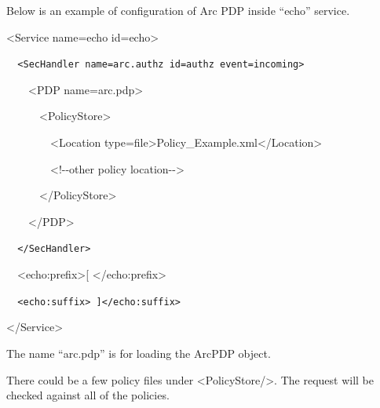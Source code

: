 \documentclass[a4paper]{article}
\begin{document}
{\upshape\color{black}
Below is an example of configuration of Arc PDP inside
{\textquotedblleft}echo{\textquotedblright} service.}

{\ttfamily\color{black}
{\textless}Service name={\textquotedbl}echo{\textquotedbl}
id={\textquotedbl}echo{\textquotedbl}{\textgreater}}

{\upshape\color{black}
\foreignlanguage{spanish}{\texttt{\ \ }}\texttt{{\textless}SecHandler
name={\textquotedbl}arc.authz{\textquotedbl}
id={\textquotedbl}authz{\textquotedbl}
event={\textquotedbl}incoming{\textquotedbl}{\textgreater}}}

{\ttfamily\color{black}
\ \ \ \ {\textless}PDP
name={\textquotedbl}arc.pdp{\textquotedbl}{\textgreater}}

{\ttfamily\color{black}
\ \ \ \ \ \ {\textless}PolicyStore{\textgreater}}

{\ttfamily\color{black}
\ \ \ \ \ \ \ \ {\textless}Location
type={\textquotedbl}file{\textquotedbl}{\textgreater}Policy\_Example.xml{\textless}/Location{\textgreater}}

{\ttfamily\color{black}
\ \ \ \ \ \ \ \ {\textless}!-{}-other policy location-{}-{\textgreater}}

{\ttfamily\color{black}
\ \ \ \ \ \ {\textless}/PolicyStore{\textgreater}}

{\ttfamily\color{black}
\ \ \ \ {\textless}/PDP{\textgreater}}

{\upshape\color{black}
\texttt{\ \ }\foreignlanguage{spanish}{\texttt{{\textless}/SecHandler{\textgreater}}}}

{\ttfamily\color{black}
\ \ {\textless}echo:prefix{\textgreater}[
{\textless}/echo:prefix{\textgreater}}

{\upshape\color{black}
\foreignlanguage{spanish}{\texttt{\ \ }}\texttt{{\textless}echo:suffix{\textgreater}
]{\textless}/echo:suffix{\textgreater}}}

{\ttfamily\color{black}
{\textless}/Service{\textgreater}}

{\color{black}
The name {\textquotedblleft}arc.pdp{\textquotedblright} is for loading
the ArcPDP object.}

{\color{black}
There could be a few policy files under
{\textless}PolicyStore/{\textgreater}. The request will be checked
against all of the policies.}
\end{document}
